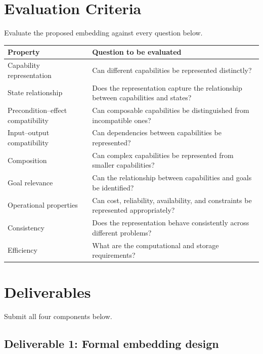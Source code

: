 \documentclass[11pt]{article}
\renewcommand{\arraystretch}{1.18}
\begin{document}
\clearpage
\section{Evaluation Criteria}

Evaluate the proposed embedding against every question below.

\begin{center}
\small
\renewcommand{\arraystretch}{1.3}
\begin{tabularx}{\textwidth}{@{}L{4.5cm}Y@{}}
\toprule
\textbf{Property} & \textbf{Question to be evaluated} \\
\midrule
Capability representation & Can different capabilities be represented distinctly? \\[0.35em]
State relationship & Does the representation capture the relationship between capabilities
and states? \\[0.35em]
Precondition--effect compatibility & Can composable capabilities be distinguished from
incompatible ones? \\[0.35em]
Input--output compatibility & Can dependencies between capabilities be represented? \\[0.35em]
Composition & Can complex capabilities be represented from smaller capabilities? \\[0.35em]
Goal relevance & Can the relationship between capabilities and goals be identified? \\[0.35em]
Operational properties & Can cost, reliability, availability, and constraints be represented
appropriately? \\[0.35em]
Consistency & Does the representation behave consistently across different problems? \\[0.35em]
Efficiency & What are the computational and storage requirements? \\
\bottomrule
\end{tabularx}
\renewcommand{\arraystretch}{1.18}
\end{center}

\section{Deliverables}

Submit all four components below.

\subsection*{Deliverable 1: Formal embedding design}
\end{document}
